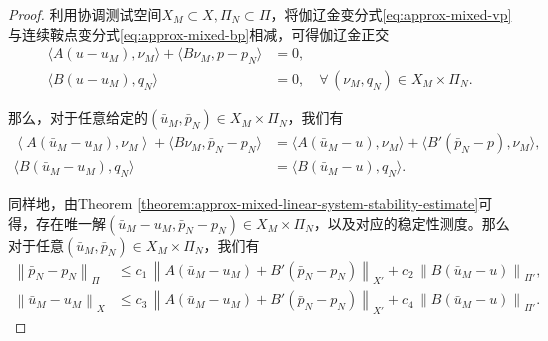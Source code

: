 \begin{proof}
  利用协调测试空间$X_{M} \subset X, \Pi_{N} \subset \Pi$，将伽辽金变分式\eqref{eq:approx-mixed-vp}与连续鞍点变分式\eqref{eq:approx-mixed-bp}相减，可得伽辽金正交
  \begin{equation*}
    \begin{split}
      \langle A \left( u - u_{M} \right), \nu_{M} \rangle +
      \langle B \nu_{M}, p-p_{N} \rangle &=0, \\
      \langle B \left( u - u_{M} \right), q_{N} \rangle & = 0, \quad \forall \, \left( \nu_{M}, q_{N} \right) \in X_{M} \times \Pi_{N}.
    \end{split}
  \end{equation*}

  那么，对于任意给定的$\left( \bar{u}_{M}, \bar{p}_{N} \right) \in X_{M} \times \Pi_{N}$，我们有
  \begin{equation*}
    \begin{split}
      \left\langle A \left( \bar{u}_{M} - u_{M} \right), \nu_{M} \right\rangle
      + \langle B \nu_{M}, \bar{p}_{N} - p_{N} \rangle
      &= \langle A \left(\bar{u}_{M} - u \right), \nu_{M} \rangle
      + \langle B' \left( \bar{p}_{N} - p \right), \nu_{M} \rangle, \\
      \langle B \left( \bar{u}_{M} - u_{M} \right), q_{N} \rangle
      & = \langle B \left( \bar{u}_{M} - u \right), q_{N} \rangle.
    \end{split}
  \end{equation*}

  同样地，由Theorem \eqref{theorem:approx-mixed-linear-system-stability-estimate}可得，存在唯一解$\left( \bar{u}_{M} - u_{M}, \bar{p}_{N} - p_{N} \right) \in X_{M} \times \Pi_{N}$，以及对应的稳定性测度。那么对于任意$\left( \bar{u}_{M}, \bar{p}_{N} \right) \in X_{M} \times \Pi_{N}$，我们有
  \begin{equation*}
    \begin{split}
      \left\| \bar{p}_{N} - p_{N} \right\|_{\Pi}
      & \le c_{1} \, \left\|
      A \left(\bar{u}_{M} - u_{M} \right)
      + B' \left( \bar{p}_{N} - p_{N} \right)
      \right\|_{X'}
      + c_{2} \, \left\| B \left( \bar{u}_{M} - u \right) \right\|_{\Pi'}, \\
      \left\| \bar{u}_{M} - u_{M} \right\|_{X}
      & \le c_{3} \, \left\|
      A \left(\bar{u}_{M} - u_{M} \right)
      + B' \left( \bar{p}_{N} - p_{N} \right)
      \right\|_{X'}
      + c_{4} \, \left\| B \left( \bar{u}_{M} - u \right) \right\|_{\Pi'}.
    \end{split}
  \end{equation*}


\end{proof}
